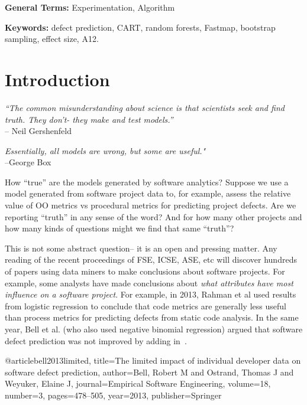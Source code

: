 \documentclass{sig-alternative}
\begin{document}
\vspace{1mm}
\noindent
{\bf General Terms:} Experimentation, Algorithm

\vspace{1mm}
\noindent
{\bf Keywords:} defect prediction, CART, random forests,
Fastmap,   bootstrap sampling, effect size, A12.

\section{Introduction}

\begin{raggedleft}
{\em ``The  common misunderstanding about science 
is that scientists seek and find truth. They don't- 
they make and test models.''}\\ -- Neil Gershenfeld

{\em Essentially, all models are wrong, but some are useful."}\\ --George Box

\end{raggedleft}

How ``true'' are the  models generated by software analytics?
Suppose we use a model generated from software project data to, for example,
assess the relative value of OO metrics vs procedural metrics for predicting
project defects. Are we reporting ``truth'' in any sense of the word? And for how
many other projects  and how many kinds of questions might we find that same ``truth''? 

This is not some abstract question-- it is an open and pressing matter.
Any reading of the recent proceedings of FSE, ICSE, ASE, etc will discover hundreds
of papers using data miners to make conclusions about software projects. 
For example, some  analysts have made conclusions
about 
{\em what attributes
have most influence on a software project}.
For example, in 2013,
Rahman et al
\cite{rahman2013how}  used results from logistic regression to conclude
that code metrics are generally less useful than process
metrics for  predicting defects from static code analysis.  
In the same year, Bell et al. (who also used negative binomial regression) argued that
software defect prediction was not improved by adding in~\cite{bell2013limited}.

@article{bell2013limited,
  title={The limited impact of individual developer data on software defect prediction},
  author={Bell, Robert M and Ostrand, Thomas J and Weyuker, Elaine J},
  journal={Empirical Software Engineering},
  volume={18},
  number={3},
  pages={478--505},
  year={2013},
  publisher={Springer}
}
\end{document}
